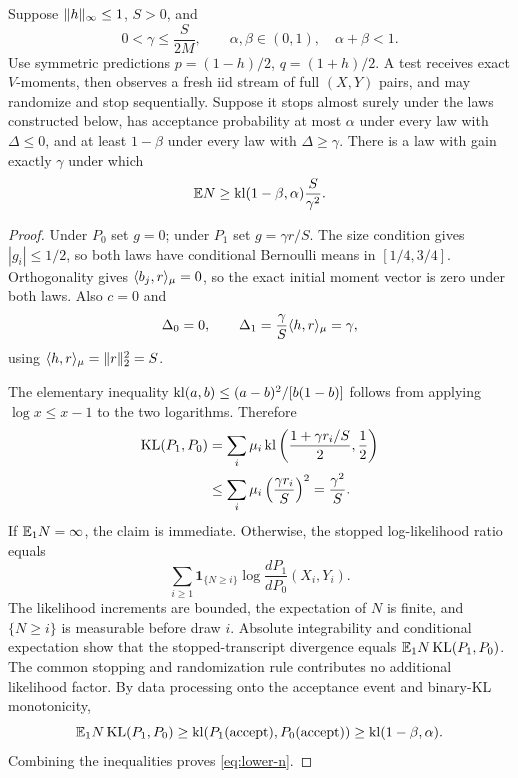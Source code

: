 \begin{theorem}\label{thm:lower}
Suppose $\lVert h\rVert_\infty\le1$, $S>0$, and
\[
 0<\gamma\le \frac{S}{2M},\qquad
 \alpha,\beta\in(0,1),\quad\alpha+\beta<1.
\]
Use symmetric predictions $p=(1-h)/2$, $q=(1+h)/2$. A test receives exact $V$-moments, then observes a fresh iid stream of full $(X,Y)$ pairs, and may randomize and stop sequentially. Suppose it stops almost surely under the laws constructed below, has acceptance probability at most $\alpha$ under every law with $\Delta\le0$, and at least $1-\beta$ under every law with $\Delta\ge\gamma$. There is a law with gain exactly $\gamma$ under which
\begin{equation}
 \mathbb E N\ge \operatorname{kl}(1-\beta,\alpha)\frac{S}{\gamma^2}.
 \label{eq:lower-n}
\end{equation}
\end{theorem}
\begin{proof}
Under $P_0$ set $g=0$; under $P_1$ set $g=\gamma r/S$. The size condition gives $|g_i|\le1/2$, so both laws have conditional Bernoulli means in $[1/4,3/4]$. Orthogonality gives $\langle b_j,r\rangle_\mu=0$, so the exact initial moment vector is zero under both laws. Also $c=0$ and
\[
 \Delta_0=0,\qquad
 \Delta_1=\frac\gamma S\langle h,r\rangle_\mu=\gamma,
\]
using $\langle h,r\rangle_\mu=\lVert r\rVert_2^2=S$.

The elementary inequality
$\operatorname{kl}(a,b)\le(a-b)^2/[b(1-b)]$ follows from applying $\log x\le x-1$ to the two logarithms. Therefore
\begin{align*}
 \operatorname{KL}(P_1,P_0)
 &=\sum_i\mu_i\operatorname{kl}\left(\frac{1+\gamma r_i/S}{2},\frac12\right)\\
 &\le\sum_i\mu_i\left(\frac{\gamma r_i}{S}\right)^2
 =\frac{\gamma^2}{S}.
\end{align*}
If $\mathbb E_1N=\infty$, the claim is immediate. Otherwise, the stopped log-likelihood ratio equals
\[
 \sum_{i\ge1}\mathbf1_{\{N\ge i\}}
       \log\frac{dP_1}{dP_0}(X_i,Y_i).
\]
The likelihood increments are bounded, the expectation of $N$ is finite, and $\{N\ge i\}$ is measurable before draw $i$. Absolute integrability and conditional expectation show that the stopped-transcript divergence equals $\mathbb E_1N\operatorname{KL}(P_1,P_0)$. The common stopping and randomization rule contributes no additional likelihood factor. By data processing onto the acceptance event and binary-KL monotonicity,
\[
 \mathbb E_1N\operatorname{KL}(P_1,P_0)
 \ge\operatorname{kl}(P_1(\mathrm{accept}),P_0(\mathrm{accept}))
 \ge\operatorname{kl}(1-\beta,\alpha).
\]
Combining the inequalities proves \eqref{eq:lower-n}.
\end{proof}

